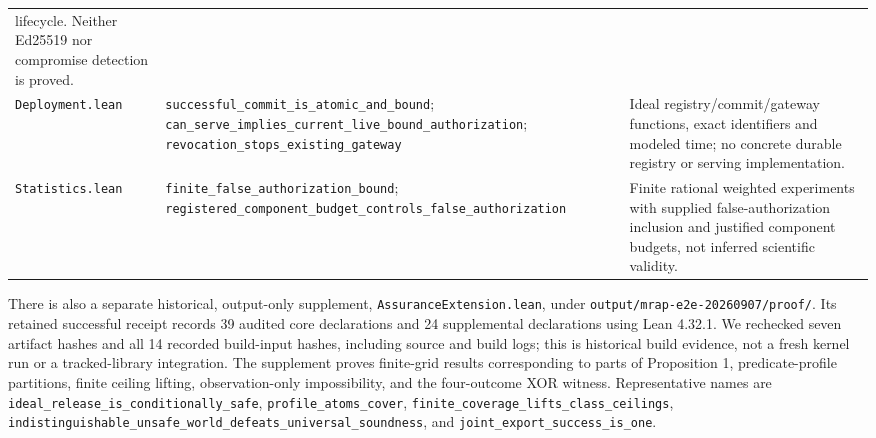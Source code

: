\documentclass[conference,compsoc]{IEEEtran}
\begin{document}
\begin{table}[t]
\begin{tabular}{>{\raggedright\arraybackslash}p{}>{\raggedright\arraybackslash}p{}>{\raggedright\arraybackslash}p{}}
lifecycle. Neither Ed25519 nor compromise detection is proved. \\
\texttt{Deployment.lean} &
\texttt{successful\_\allowbreak commit\_\allowbreak is\_\allowbreak atomic\_\allowbreak and\_\allowbreak bound};
\texttt{can\_\allowbreak serve\_\allowbreak implies\_\allowbreak current\_\allowbreak live\_\allowbreak bound\_\allowbreak authorization};
\texttt{revocation\_\allowbreak stops\_\allowbreak existing\_\allowbreak gateway} &
Ideal registry/commit/gateway functions, exact identifiers and modeled time;
no concrete durable registry or serving implementation. \\
\texttt{Statistics.lean} &
\texttt{finite\_\allowbreak false\_\allowbreak authorization\_\allowbreak bound};
\texttt{registered\_\allowbreak component\_\allowbreak budget\_\allowbreak controls\_\allowbreak false\_\allowbreak authorization} &
Finite rational weighted experiments with supplied false-authorization inclusion
and justified component budgets, not inferred scientific validity. \\
\hline
\end{tabular}
\end{table}

There is also a separate historical, output-only supplement,
\texttt{AssuranceExtension.lean}, under
\texttt{output/mrap-e2e-20260907/proof/}. Its retained successful receipt records
39 audited core declarations and 24 supplemental declarations using Lean 4.32.1.
We rechecked seven artifact hashes and all 14 recorded build-input hashes,
including source and build logs;
this is historical build evidence, not a fresh kernel run or a tracked-library
integration. The supplement proves finite-grid results corresponding to parts
of Proposition 1, predicate-profile partitions, finite ceiling lifting,
observation-only impossibility, and the four-outcome XOR witness. Representative
names are \texttt{ideal\_\allowbreak release\_\allowbreak is\_\allowbreak conditionally\_\allowbreak safe},
\texttt{profile\_\allowbreak atoms\_\allowbreak cover}, \texttt{finite\_\allowbreak coverage\_\allowbreak lifts\_\allowbreak class\_\allowbreak ceilings},
\texttt{indistinguishable\_\allowbreak unsafe\_\allowbreak world\_\allowbreak defeats\_\allowbreak universal\_\allowbreak soundness}, and
\texttt{joint\_\allowbreak export\_\allowbreak success\_\allowbreak is\_\allowbreak one}.
\end{document}
